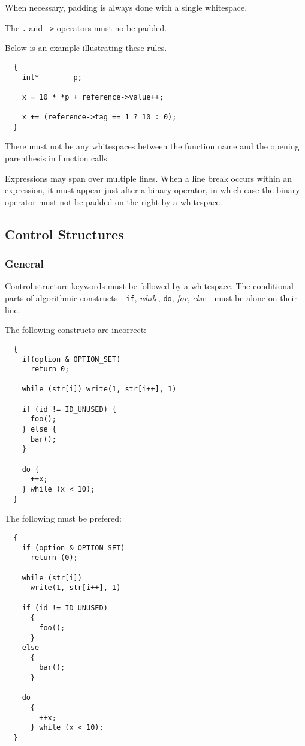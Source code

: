 When necessary, padding is always done with a single whitespace.

The \verb|.| and \verb|->| operators must no be padded.

Below is an example illustrating these rules.

\begin{verbatim}
  {
    int*        p;

    x = 10 * *p + reference->value++;

    x += (reference->tag == 1 ? 10 : 0);
  }
\end{verbatim}

There must not be any whitespaces between the function name and the opening
parenthesis in function calls.

Expressions may span over multiple lines. When a line break occurs within
an expression, it must appear just after a binary operator, in which case the
binary operator must not be padded on the right by a whitespace.

%
%

\subsection{Control Structures}


\subsubsection{General}

Control structure keywords must be followed by a whitespace. The conditional
parts of algorithmic constructs - \texttt{if}, \textit{while}, \texttt{do},
\textit{for}, \textit{else} - must be alone on their line.

The following constructs are incorrect:

\begin{verbatim}
  {
    if(option & OPTION_SET)
      return 0;

    while (str[i]) write(1, str[i++], 1)

    if (id != ID_UNUSED) {
      foo();
    } else {
      bar();
    }

    do {
      ++x;
    } while (x < 10);
  }
\end{verbatim}

The following must be prefered:

\begin{verbatim}
  {
    if (option & OPTION_SET)
      return (0);

    while (str[i])
      write(1, str[i++], 1)

    if (id != ID_UNUSED)
      {
        foo();
      }
    else
      {
        bar();
      }

    do
      {
        ++x;
      } while (x < 10);
  }
\end{verbatim}

